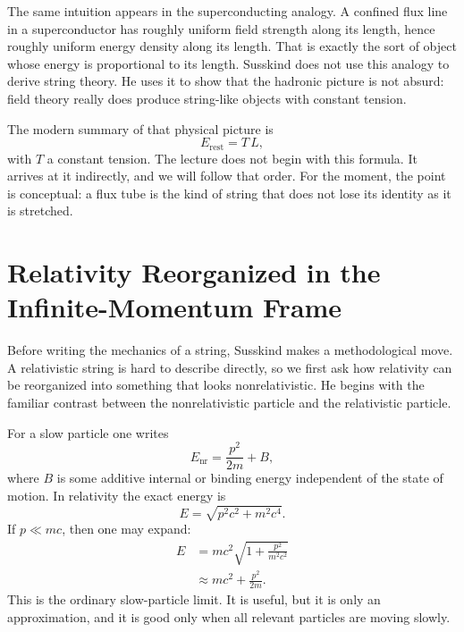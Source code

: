 The same intuition appears in the superconducting analogy. A confined flux line in a superconductor has roughly uniform field strength along its length, hence roughly uniform energy density along its length. That is exactly the sort of object whose energy is proportional to its length. Susskind does not use this analogy to derive string theory. He uses it to show that the hadronic picture is not absurd: field theory really does produce string-like objects with constant tension.

The modern summary of that physical picture is
\begin{equation}
E_{\text{rest}} = T\,L,
\end{equation}
with \(T\) a constant tension. The lecture does not begin with this formula. It arrives at it indirectly, and we will follow that order. For the moment, the point is conceptual: a flux tube is the kind of string that does not lose its identity as it is stretched.

\section{Relativity Reorganized in the Infinite-Momentum Frame}

Before writing the mechanics of a string, Susskind makes a methodological move. A relativistic string is hard to describe directly, so we first ask how relativity can be reorganized into something that looks nonrelativistic. He begins with the familiar contrast between the nonrelativistic particle and the relativistic particle.

For a slow particle one writes
\begin{equation}
E_{\mathrm{nr}}=\frac{p^2}{2m}+B,
\end{equation}
where \(B\) is some additive internal or binding energy independent of the state of motion. In relativity the exact energy is
\begin{equation}
E=\sqrt{p^2c^2+m^2c^4}.
\end{equation}
If \(p\ll mc\), then one may expand:
\begin{align}
E
&=
mc^2\sqrt{1+\frac{p^2}{m^2c^2}}
\\
&\approx
mc^2+\frac{p^2}{2m}.
\end{align}
This is the ordinary slow-particle limit. It is useful, but it is only an approximation, and it is good only when all relevant particles are moving slowly.

